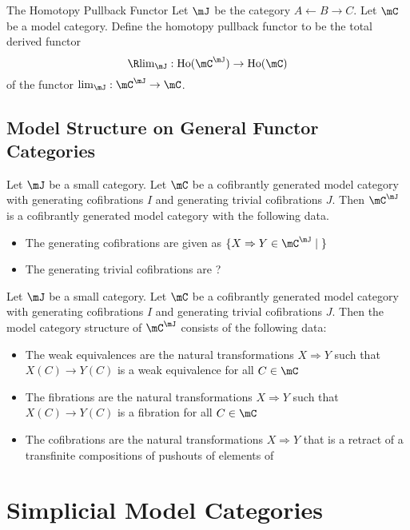 \documentclass[a4paper]{article}
\begin{document}
\begin{defn}{The Homotopy Pullback Functor}{} Let $\mJ$ be the category $A\leftarrow B\rightarrow C$. Let $\mC$ be a model category. Define the homotopy pullback functor to be the total derived functor $$\R\text{lim}_\mJ:\text{Ho}(\mC^\mJ)\to\text{Ho}(\mC)$$ of the functor $\text{lim}_\mJ:\mC^\mJ\to\mC$. 
\end{defn}

\subsection{Model Structure on General Functor Categories}
\begin{thm}{}{} Let $\mJ$ be a small category. Let $\mC$ be a cofibrantly generated model category with generating cofibrations $I$ and generating trivial cofibrations $J$. Then $\mC^\mJ$ is a cofibrantly generated model category with the following data. 
\begin{itemize}
\item The generating cofibrations are given as $\{X\Rightarrow Y\in\mC^\mJ\;|\;\}$
\item The generating trivial cofibrations are ?
\end{itemize}
\end{thm}

\begin{prp}{}{} Let $\mJ$ be a small category. Let $\mC$ be a cofibrantly generated model category with generating cofibrations $I$ and generating trivial cofibrations $J$. Then the model category structure of $\mC^\mJ$ consists of the following data: 
\begin{itemize}
\item The weak equivalences are the natural transformations $X\Rightarrow Y$ such that $X(C)\to Y(C)$ is a weak equivalence for all $C\in\mC$
\item The fibrations are the natural transformations $X\Rightarrow Y$ such that $X(C)\to Y(C)$ is a fibration for all $C\in\mC$
\item The cofibrations are the natural transformations $X\Rightarrow Y$ that is a retract of a transfinite compositions of pushouts of elements of 
\end{itemize}
\end{prp}

\pagebreak
\section{Simplicial Model Categories}
\end{document}

